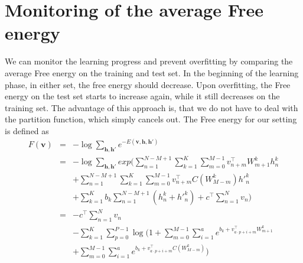 \documentclass[12pt]{article}
\begin{document}
\section{Monitoring of the average Free energy}
We can monitor the learning progress and prevent overfitting by comparing 
the average Free energy on the training and test set. In the beginning of 
the learning phase, in either set, the free energy should decrease.
Upon overfitting, the Free energy on the test set starts to increase again,
while it still decreases on the training set.
The advantage of this approach is, that we do not have to deal with 
the partition function, which simply cancels out.
The Free energy for our setting is defined as
\begin{align}
	F(\mathbf{v})&=&-\log \sum_{\mathbf{h},\mathbf{h}'}e^{-E(\mathbf{v},\mathbf{h},\mathbf{h}')}\\
	&=&-\log\sum_{\mathbf{h},\mathbf{h}'} 
	exp(
	\sum_{n=1}^{N-M+1}\sum_{k=1}^K\sum_{m=0}^{M-1} v_{n+m}^\top W_{m+1}^k h_n^k \nonumber\\
	&&+\sum_{n=1}^{N-M+1}\sum_{k=1}^K\sum_{m=0}^{M-1} v_{n+m}^\top C(W_{M-m}^k) {h'}_n^k\nonumber\\
	&& +\sum_{k=1}^K b_k \sum_{n=1}^{N-M+1}(h_n^k + {h'}_n^k)
	+c^\top \sum_{n=1}^{N}v_n )\\
	&=&-c^\top\sum_{n=1}^{N}v_n \nonumber\\
	&&-\sum_{k=1}^K\sum_{p=0}^{P-1}\log(
	1+\sum_{m=0}^{M-1}\sum_{i=1}^a e^{b_k + v^\top_{a\cdot p+i+m}W^k_{m+1}}\nonumber\\
	&&+\sum_{m=0}^{M-1}\sum_{i=1}^a e^{b_k + v^\top_{a\cdot p+i+m}C(W^k_{M-m})})\\
\end{align}
\end{document}
